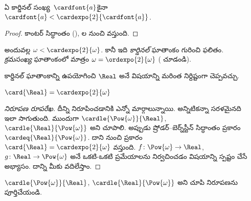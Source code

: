 \documentclass[../../../include/open-logic-section]{subfiles}
\begin{document}
\begin{cor}
ఏ కార్డినల్ సంఖ్య~$\cardfont{a}$కైనా $\cardfont{a} < \cardexpo{2}{\cardfont{a}}$.
\end{cor}

\begin{proof}
కాంటర్ సిద్ధాంతం (), ల నుంచి వస్తుంది.
\end{proof}
\noindent
అందువల్ల $\omega < \cardexpo{2}{\omega}$. కానీ ఇది \emph{కార్డినల్} ఘాతాంకం గురించి ఫలితం. \emph{క్రమసంఖ్య} ఘాతాంకంలో మాత్రం $\omega =
\ordexpo{2}{\omega}$ ( చూడండి).

కార్డినల్ ఘాతాంకాన్ని ఉపయోగించి $\Real$ 
అనే విషయాన్ని మరింత నిర్దిష్టంగా చెప్పవచ్చు.

\begin{thm}
$\card{\Real} = \cardexpo{2}{\omega}$
\end{thm}

\begin{proof}[నిరూపణ రూపరేఖ]
దీన్ని నిరూపించడానికి ఎన్నో మార్గాలున్నాయి. అన్నిటికన్నా
సరళమైనది ఇలా సాగుతుంది. ముందుగా $\cardle{\Pow{\omega}}{\Real}$,
$\cardle{\Real}{\Pow{\omega}}$ అని చూపాలి. అప్పుడు
ష్రోడర్--బెర్న్‌స్టీన్ సిద్ధాంతం ప్రకారం $\cardeq{\Real}{\Pow{\omega}}$.
దాని నుంచి 
ప్రకారం $\card{\Real} = \cardexpo{2}{\omega}$ వస్తుంది.
$f \colon \Pow{\omega} \to \Real$, $g \colon \Real \to \Pow{\omega}$
అనే ఒకటి-ఒకటి ప్రమేయాలను నిర్వచించడం విషయాన్ని
స్పష్టం చేసే అభ్యాసం. దాన్ని మీకు వదిలేస్తాం.
\end{proof}

\begin{prob}
$\cardle{\Pow{\omega}}{\Real}$, $\cardle{\Real}{\Pow{\omega}}$ అని చూపి  నిరూపణను పూర్తిచేయండి.
\end{prob}
\end{document}
